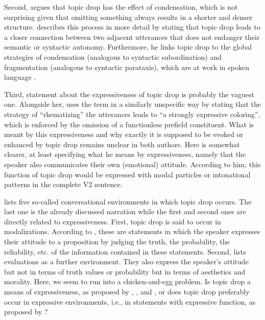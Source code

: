 Second, \citet[104]{guenthner2006} argues that topic drop has the effect of condensation, which is not surprising given that omitting something always results in a shorter and denser structure.
\citet{auer1993} describes this process in more detail by stating that topic drop leads to a closer connection between two adjacent utterances that does not endanger their semantic or syntactic autonomy.
Furthermore, he links topic drop to the global strategies of condensation (analogous to syntactic subordination) and fragmentation (analogous to syntactic parataxis), which are at work in spoken language \citep[219]{auer1993}.

Third,  statement about the expressiveness of topic drop is probably the vaguest one.
Alongside her, \citet[179--180]{oppenrieder1987} uses the term in a similarly unspecific way by stating that the strategy of ``rhematizing'' the utterances leads to ``a strongly expressive coloring'', which is enforced by the omission of a functionless prefield constituent.
What is meant by this expressiveness and why exactly it is supposed to be evoked or enhanced by topic drop remains unclear in both authors.
Here \citet[127--128]{poitou1993} is somewhat clearer, at least specifying what he means by expressiveness, namely that the speaker also communicates their own (emotional) attitude.
According to him, this function of topic drop would be expressed with modal particles or intonational patterns in the complete V2 sentence.

\citet{auer1993} lists five so-called conversational environments in which topic drop occurs.
The last one is the already discussed narration while the first and second ones are directly related to expressiveness.
First, topic drop is said to occur in modalizations.
According to \citet[207]{auer1993}, these are statements in which the speaker expresses their attitude to a proposition by judging the truth, the probability, the reliability, etc. of the information contained in these statements.
Second, \citet[208]{auer1993} lists evaluations as a further environment.
They also express the speaker's attitude but not in terms of truth values or probability but in terms of aesthetics and morality.
Here, we seem to run into a chicken-and-egg problem.
Is topic drop a means of expressiveness, as proposed by \citet{oppenrieder1987}, \citet{poitou1993}, and \citet{guenthner2006}, or does topic drop preferably occur in expressive environments, i.e., in statements with expressive function, as proposed by \citet{auer1993}?

